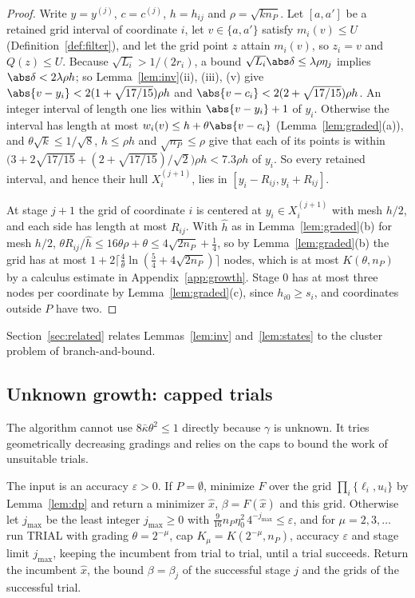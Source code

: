 \begin{proof}
Write $y=y^{(j)}$, $c=c^{(j)}$, $h=h_{ij}$ and $\rho=\sqrt{kn_P}$. Let
$[a,a']$ be a retained grid interval of coordinate $i$, let
$v\in\{a,a'\}$ satisfy $m_i(v)\le U$ (Definition~\ref{def:filter}), and let
the grid point $z$ attain $m_i(v)$, so $z_i=v$ and $Q(z)\le U$. Because
$\sqrt{L_i}>1/(2r_i)$, a bound $\sqrt{L_i}\abs\delta\le\lambda\rho\eta_j$
implies $\abs\delta<2\lambda\rho h$; so Lemma~\ref{lem:inv}(ii), (iii), (v)
give $\abs{v-y_i}<2(1+\sqrt{17/15})\rho h$ and
$\abs{v-c_i}<2(2+\sqrt{17/15})\rho h$. An integer interval of length one
lies within $\abs{v-y_i}+1$ of $y_i$. Otherwise the interval has length at
most $w_i(v)\le h+\theta\abs{v-c_i}$ (Lemma~\ref{lem:graded}(a)), and
$\theta\sqrt k\le1/\sqrt8$, $h\le\rho h$ and $\sqrt{n_P}\le\rho$ give that
each of its points is within
$\bigl(3+2\sqrt{17/15}+(2+\sqrt{17/15})/\sqrt2\bigr)\rho h<7.3\rho h$ of
$y_i$. So every retained interval, and hence their hull $X_i^{(j+1)}$, lies
in $[y_i-R_{ij},y_i+R_{ij}]$.

At stage $j+1$ the grid of coordinate $i$ is centered at
$y_i\in X_i^{(j+1)}$ with mesh $h/2$, and each side has length at most
$R_{ij}$. With $\hat h$ as in Lemma~\ref{lem:graded}(b) for mesh $h/2$,
$\theta R_{ij}/\hat h\le16\theta\rho+\theta\le4\sqrt{2n_P}+\frac14$, so by
Lemma~\ref{lem:graded}(b) the grid has at most
$1+2\lceil\frac4\theta\ln(\frac54+4\sqrt{2n_P})\rceil$ nodes, which is at
most $K(\theta,n_P)$ by a calculus estimate in Appendix~\ref{app:growth}.
Stage $0$ has at most three nodes per
coordinate by Lemma~\ref{lem:graded}(c), since $h_{i0}\ge s_i$, and
coordinates outside $P$ have two.
\end{proof}

Section~\ref{sec:related} relates Lemmas~\ref{lem:inv} and~\ref{lem:states}
to the cluster problem of branch-and-bound.

\subsection{Unknown growth: capped trials}
The algorithm cannot use $8\bar\kappa\theta^2\le1$ directly because $\gamma$
is unknown. It tries geometrically decreasing gradings and relies on the caps
to bound the work of unsuitable trials.

\begin{algorithm}\label{alg:ct}
The input is an accuracy $\varepsilon>0$. If $P=\emptyset$, minimize $F$
over the grid $\prod_i\{\ell_i,u_i\}$ by Lemma~\ref{lem:dp} and return a
minimizer $\hat x$, $\beta=F(\hat x)$ and this grid. Otherwise let
$j_{\max}$ be the least integer $j_{\max}\ge0$ with
$\frac9{16}n_P\eta_0^2\,4^{-j_{\max}}\le\varepsilon$, and for
$\mu=2,3,\dots$ run TRIAL with grading $\theta=2^{-\mu}$, cap
$K_\mu=K(2^{-\mu},n_P)$, accuracy $\varepsilon$ and stage limit $j_{\max}$,
keeping the incumbent from trial to trial, until a trial succeeds. Return the
incumbent $\hat x$, the bound $\beta=\beta_j$ of the successful stage $j$ and
the grids of the successful trial.
\end{algorithm}

